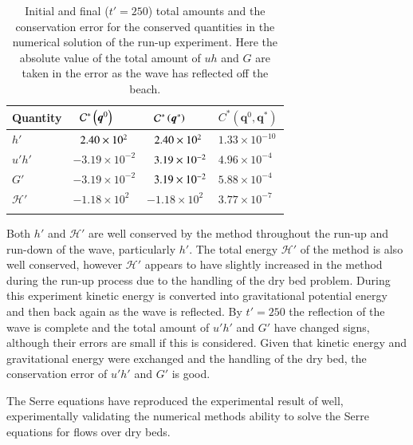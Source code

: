 \documentclass[times]{elsarticle}
\newcommand\T{\rule{0pt}{5ex }}       %
\newcommand\B{\rule[-4ex]{0pt}{4ex }} %
\newcommand{\vecn}[1]{\boldsymbol{#1}}
\begin{document}
\begin{table}
	\centering
	\begin{tabular}{l l l l}
		\hline
		Quantity& $\hphantom{-}\mathcal{C}^*\left(\vecn{q}^0\right)$ & $\hphantom{-}\mathcal{C}^*\left(\vecn{q}^*\right)$ & ${C}^*\left(\vecn{q}^0,\vecn{q}^*\right)$  \T\B\\
		\hline 
		$h'$ & $\hphantom{-}2.40\times 10^2$ & $\hphantom{-}2.40 \times 10^2$ & $1.33\times 10^{-10}$ \T \\
		$u'h'$ & $-3.19 \times 10 ^{-2}$ & $\hphantom{-}3.19 \times 10 ^{-2}$ & $4.96\times 10^{-4}$\\
		$G'$ & $-3.19 \times 10 ^{-2}$ & $\hphantom{-}3.19 \times 10 ^{-2}$ & $5.88\times 10^{-4}$\\
		$\mathcal{H}'$ & $-1.18 \times 10^{2}$ & $-1.18 \times 10^{2}$ & $3.77 \times 10^{-7}$ \B\\
		\hline \\
	\end{tabular}
	\caption{Initial and final ($t'=250$) total amounts and the conservation error for the conserved quantities in the numerical solution of the run-up experiment. Here the absolute value of the total amount of $uh$ and $G$ are taken in the error as the wave has reflected off the beach.}
	\label{tab:ConservationSynFEVM}
\end{table}

Both $h'$ and $\mathcal{H}'$ are well conserved by the method throughout the run-up and run-down of the wave, particularly $h'$. The total energy $\mathcal{H}'$ of the method is also well conserved, however $\mathcal{H}'$ appears to have slightly increased in the method during the run-up process due to the handling of the dry bed problem. During this experiment kinetic energy is converted into gravitational potential energy and then back again as the wave is reflected. By $t' = 250$ the reflection of the wave is complete and the total amount of $u'h'$ and $G'$ have changed signs, although their errors are small if this is considered. Given that kinetic energy and gravitational energy were exchanged and the handling of the dry bed, the conservation error of $u'h'$ and $G'$ is good. 

The Serre equations have reproduced the experimental result of \citet{Synolakis-1987-523} well, experimentally validating the numerical methods ability to solve the Serre equations for flows over dry beds.
\end{document}
